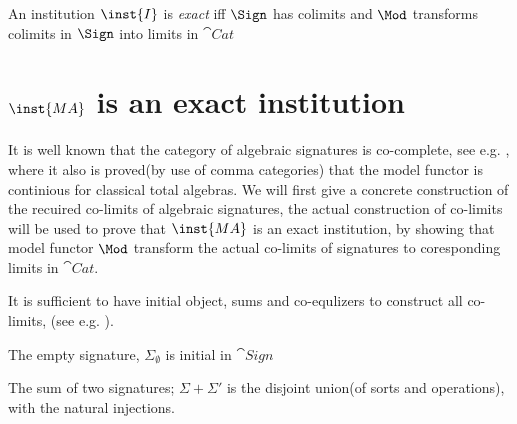 \begin{definition} An institution $\inst{I}$ is {\em exact} iff $\Sign$ has colimits and $\Mod$ transforms colimits in $\Sign$ into limits in $\cat{Cat}$
\end{definition}

%




\newpage
\section{$\inst{MA}$ is an exact institution}
\label{se:exact}

It is well known that the category of algebraic signatures is co-complete, see e.g. \cite{fundamental1}, where it also is proved(by use of comma categories) that the model functor is continious for classical total algebras. We will first give a concrete construction of the recuired co-limits of algebraic signatures, the actual construction of co-limits will be used to prove that $\inst{MA}$ is an exact institution, by showing that model functor $\Mod$ transform the actual co-limits of signatures to coresponding limits in $\cat{Cat}$.

It is sufficient to have initial object, sums and co-equlizers to construct all co-limits, (see e.g. \cite{cat}).

\begin{fact}
The empty signature, $\Sigma_{\emptyset}$ is initial in $\cat{Sign}$
\end{fact}

\begin{fact}
The sum of two signatures; $\Sigma + \Sigma'$ is the disjoint union(of sorts and operations), with the natural injections.
\end{fact}

